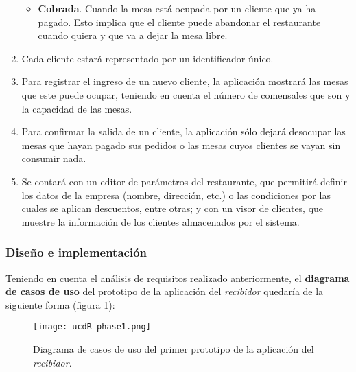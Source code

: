 \begin{enumerate}
\begin{itemize}
  \item \textbf{Cobrada}. Cuando la mesa está ocupada por un cliente que ya
  ha pagado. Esto implica que el cliente puede abandonar el restaurante
  cuando quiera y que va a dejar la mesa libre.
  \end{itemize}
\item Cada cliente estará representado por un identificador único.
\item Para registrar el ingreso de un nuevo cliente, la aplicación mostrará
las mesas que este puede ocupar, teniendo en cuenta el número de comensales que
son y la capacidad de las mesas.
\item Para confirmar la salida de un cliente, la aplicación sólo dejará
desocupar las mesas que hayan pagado sus pedidos o las mesas cuyos clientes
se vayan sin consumir nada.
\item Se contará con un editor de parámetros del restaurante, que permitirá
definir los datos de la empresa (nombre, dirección, etc.) o las condiciones
por las cuales se aplican descuentos, entre otras; y con un visor de clientes,
que muestre la información de los clientes almacenados por el sistema.
\end{enumerate}

\subsubsection{Diseño e implementación}
Teniendo en cuenta el análisis de requisitos realizado anteriormente, el
\textbf{diagrama de casos de uso} del prototipo de la aplicación del
\emph{recibidor} quedaría de la siguiente forma (figura \ref{fig:ucdR-phase1}):

  \begin{figure}[H]
    \begin{center}
      \texttt{[image: ucdR-phase1.png]}
      \caption{Diagrama de casos de uso del primer prototipo de la aplicación
      del \emph{recibidor}.}
      \label{fig:ucdR-phase1}
    \end{center}
  \end{figure}

